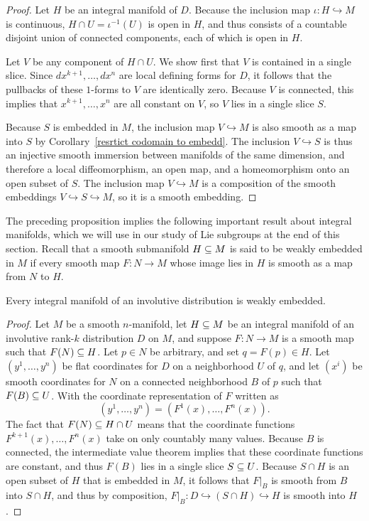 \begin{proof}
Let $H$ be an integral manifold of $D$. Because the inclusion map $\iota:H\hookrightarrow M$ is continuous, $H\cap U=\iota^{-1}(U)$ is open in $H$, and thus consists of a countable disjoint union of connected components, each of which is open in $H$.\par
Let $V$ be any component of $H\cap U$. We show first that $V$ is contained in a single slice. Since $dx^{k+1},\dots,dx^n$ are local defining forms for $D$, it follows that the pullbacks of these $1$-forms to $V$ are identically zero. Because $V$ is connected, this implies that $x^{k+1},\dots,x^n$ are all constant on $V$, so $V$ lies in a single slice $S$.\par
Because $S$ is embedded in $M$, the inclusion map $V\hookrightarrow M$ is also smooth as a map into $S$ by Corollary~\ref{resrtict codomain to embedd}. The inclusion $V\hookrightarrow S$ is thus an injective smooth immersion between manifolds of the same dimension, and therefore a local diffeomorphism, an open map, and a homeomorphism onto an open subset of $S$. The inclusion map $V\hookrightarrow M$ is a composition of the smooth embeddings $V\hookrightarrow S\hookrightarrow M$, so it is a smooth embedding.
\end{proof}
The preceding proposition implies the following important result about integral
manifolds, which we will use in our study of Lie subgroups at the end of this section. Recall that a smooth submanifold $H\subseteq M$ is said to be weakly embedded in $M$ if every smooth map $F:N\to M$ whose image lies in $H$ is smooth as a map from $N$ to $H$.
\begin{theorem}\label{integral mani weak embedd}
Every integral manifold of an involutive distribution is weakly embedded.
\end{theorem}
\begin{proof}
Let $M$ be a smooth $n$-manifold, let $H\subseteq M$ be an integral manifold of an involutive rank-$k$ distribution $D$ on $M$, and suppose $F:N\to M$ is a smooth map such that $F(N)\subseteq H$. Let $p\in N$ be arbitrary, and set $q=F(p)\in H$. Let $(y^1,\dots,y^n)$ be flat coordinates for $D$ on a neighborhood $U$ of $q$, and let $(x^i)$ be smooth coordinates for $N$ on a connected neighborhood $B$ of $p$ such that $F(B)\subseteq U$. With the coordinate representation of $F$ written as
\[(y^1,\dots,y^n)=(F^1(x),\dots,F^n(x)).\]
The fact that $F(N)\subseteq H\cap U$ means that the coordinate functions $F^{k+1}(x),\dots,F^n(x)$ take on only countably many values. Because $B$ is connected, the intermediate value theorem implies that these coordinate functions are constant, and thus $F(B)$ lies in a single slice $S\subseteq U$. Because $S\cap H$ is an open subset of $H$ that is embedded in $M$, it follows that $F|_B$ is smooth from $B$ into $S\cap H$, and thus by composition, $F|_B:D\hookrightarrow(S\cap H)\hookrightarrow H$ is smooth into $H$.
\end{proof}
